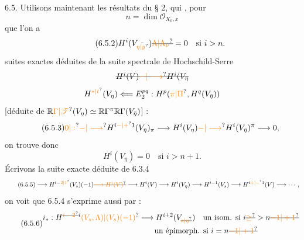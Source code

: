 6.5. Utilisons maintenant les résultats du § 2, qui ,  pour
\[
\tag*{(6.5.1)}n=\dim\mathscr{O}_{X_0,x}
\]
que l'on a
\[
\tag*{(6.5.2)}H^i(V_{\bar{\unsure{\eta|y}}})\deleted{\unsure{\Lambda|\Lambda_\nu}}=0\quad\text{si }i>n.
\]
   suites exactes déduites de  la suite spectrale de Hochschild-Serre
\[
\deleted{H^i(V)\unsure{-|\longrightarrow}H^i(V_{\bar\eta}}
\]
\[
H^{\unsure{*|t}}(V_\eta)\Longleftarrow E_2^{pq}:H^p(\unsure{\pi|\Pi},H^q(V_{\bar\eta}))
\]
[déduite de $\mathbb{R}\unsure{\Gamma|\mathscr{T}}(V_\eta)\simeq\mathbb{R}\Gamma^\pi\mathbb{R}\Gamma(V_{\bar\eta})$] :
\[
\tag*{(6.5.3)}\unsure{0|:}\unsure{-|\longrightarrow}H^{i\unsure{-|+}1}(V_{\bar\eta})_\pi\longrightarrow H^i(V_\eta)\unsure{-|\longrightarrow}H^i(V_{\bar\eta})^\pi\longrightarrow0,
\]
on trouve donc
\[
\tag*{(6.5.4)}H^i(V_\eta)=0\quad\text{si }i>n+1.
\]
 Écrivons la suite exacte déduite de 6.3.4
\[
\tag*{(6.5.5)}\longrightarrow H^{i-\unsure{2|1}}(V_s)(-1)\deleted{\unsure{\longrightarrow H^i(V)}}\longrightarrow H^i(V)\longrightarrow H^i(V_\eta)\longrightarrow H^{i-1}(V_s)\longrightarrow H^{i\unsure{+|-}1}(V)\longrightarrow\cdots,
\]
on  voit que 6.5.4 s'exprime aussi par  :
\[
\tag*{(6.5.6)}\begin{aligned}
i_*:H^{\deleted{\unsure{i-2}}i}\unsure{(V_s,\Lambda)|(V_s)(-1)}&\longrightarrow H^{i+2}(V_{\deleted{\unsure{s|\eta}}})\quad\text{un isom. si }i\deleted{\unsure{\geq}}>n\deleted{\unsure{-1|+1}}\\
&\qquad\text{un épimorph. si }i=n\deleted{\unsure{-1|+1}}
\end{aligned}
\]


